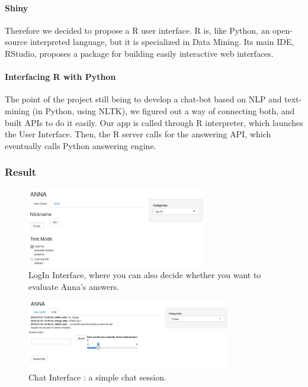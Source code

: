 \paragraph{Shiny}
\label{par:Shiny}
Therefore we decided to propose a R user interface.
R is, like Python, an open-source interpreted language, but it is specialized in Data Mining.
Its main IDE, RStudio, proposes a package for building easily interactive web interfaces.

\paragraph{Interfacing R with Python}
\label{par:rPython}
The point of the project still being to develop a chat-bot based on NLP and text-mining (in Python, using NLTK), we figured out a way of connecting both, and built APIs to do it easily.
Our app is called through R interpreter, which launches the User Interface. Then, the R server calls for the answering API, which eventually calls Python answering engine.

\newpage
\subsubsection{Result}
\label{subs:Result}

\begin{figure}[!h]
\begin{center}
\includegraphics[width=0.70\textwidth]{./img/AnnaLoginUI.png}
\end{center}
\caption{LogIn Interface, where you can also decide whether you want to evaluate Anna's answers.}
\label{fig:AnnaLoginUI}
\end{figure}

\begin{figure}[!h]
\begin{center}
\includegraphics[width=0.80\textwidth]{./img/AnnaChatUI.png}
\end{center}
\caption{Chat Interface : a simple chat session.}
\label{fig:AnnaChatUI}
\end{figure}

